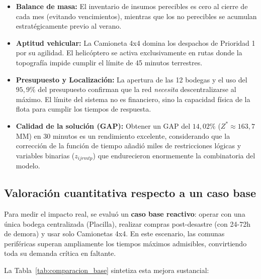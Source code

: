 \documentclass[letterpaper]{article}
\begin{document}
\begin{flushleft}
\begin{itemize}[leftmargin=2em, itemsep=3pt]
  \item \textbf{Balance de masa:} El inventario de insumos perecibles es cero al cierre de cada mes (evitando vencimientos), mientras que los no perecibles se acumulan estratégicamente previo al verano.
  \item \textbf{Aptitud vehicular:} La Camioneta 4x4 domina los despachos de Prioridad 1 por su agilidad. El helicóptero se activa exclusivamente en rutas donde la topografía impide cumplir el límite de 45 minutos terrestres.
  \item \textbf{Presupuesto y Localización:} La apertura de las 12 bodegas y el uso del $95{,}9\%$ del presupuesto confirman que la red \emph{necesita} descentralizarse al máximo. El límite del sistema no es financiero, sino la capacidad física de la flota para cumplir los tiempos de respuesta.
  \item \textbf{Calidad de la solución (GAP):} Obtener un GAP del $14{,}02\%$ ($Z^* \approx 163{,}7$ MM) en 30 minutos es un rendimiento excelente, considerando que la corrección de la función de tiempo añadió miles de restricciones lógicas y variables binarias ($z_{ijrmtp}$) que endurecieron enormemente la combinatoria del modelo.
\end{itemize}

\subsection{Valoración cuantitativa respecto a un caso base}

Para medir el impacto real, se evaluó un \textbf{caso base reactivo}: operar con una única bodega centralizada (Placilla), realizar compras post-desastre (con 24-72h de demora) y usar solo Camionetas 4x4. En este escenario, las comunas periféricas superan ampliamente los tiempos máximos admisibles, convirtiendo toda su demanda crítica en faltante.

La Tabla~\ref{tab:comparacion_base} sintetiza esta mejora sustancial:


\end{flushleft}
\end{document}
